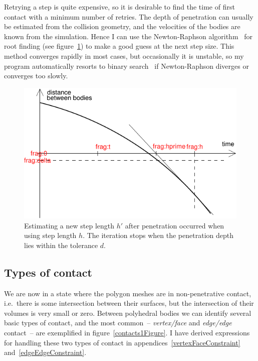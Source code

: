 Retrying a step is quite expensive, so it is desirable to find the time of first contact with a
minimum number of retries. The depth of penetration can usually be estimated from the collision
geometry, and the velocities of the bodies are known from the simulation. Hence I can use the
Newton-Raphson algorithm~\cite{NRinC} for root finding (see figure~\ref{collisionTime}) to make
a good guess at the next step size. This method converges rapidly in most cases, but
occasionally it is unstable, so my program automatically resorts to binary
search~\cite{Sedgewick:83} if Newton-Raphson diverges or converges too slowly.

\begin{figure}
\centerline{\includegraphics{figures/coll-time}}
\caption{Estimating a new step length $h'$ after penetration occurred when using step length $h$.
    The iteration stops when the penetration depth lies within the tolerance $d$.
    \label{collisionTime}}
\end{figure}

\subsection{Types of contact}

We are now in a state where the polygon meshes are in non-penetrative contact, i.e.\ there is some
intersection between their surfaces, but the intersection of their volumes is very small or zero.
Between polyhedral bodies we can identify several basic types of contact, and the most common~--
\emph{vertex/face} and \emph{edge/edge} contact~-- are exemplified in figure~\ref{contacts1Figure}.
I have derived expressions for handling these two types of contact in
appendices~\ref{vertexFaceConstraint} and~\ref{edgeEdgeConstraint}.

